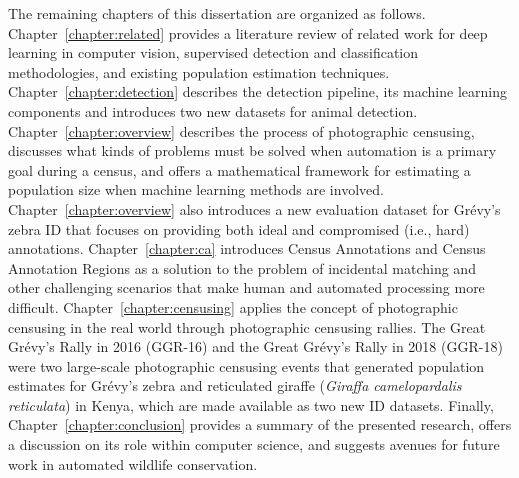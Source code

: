 The remaining chapters of this dissertation are organized as follows.  Chapter~\ref{chapter:related} provides a literature review of related work for deep learning in computer vision, supervised detection and classification methodologies, and existing population estimation techniques.  Chapter~\ref{chapter:detection} describes the detection pipeline, its machine learning components and introduces two new datasets for animal detection.  Chapter~\ref{chapter:overview} describes the process of photographic censusing, discusses what kinds of problems must be solved when automation is a primary goal during a census, and offers a mathematical framework for estimating a population size when machine learning methods are involved.  Chapter~\ref{chapter:overview} also introduces a new evaluation dataset for Gr\'evy's zebra ID that focuses on providing both ideal and compromised (i.e., hard) annotations.  Chapter~\ref{chapter:ca} introduces Census Annotations and Census Annotation Regions as a solution to the problem of incidental matching and other challenging scenarios that make human and automated processing more difficult.  Chapter~\ref{chapter:censusing} applies the concept of photographic censusing in the real world through photographic censusing rallies.  The Great Gr\'evy's Rally in 2016 (GGR-16) and the Great Gr\'evy's Rally in 2018 (GGR-18) were two large-scale photographic censusing events that generated population estimates for Gr\'evy's zebra and reticulated giraffe (\textit{Giraffa camelopardalis reticulata}) in Kenya, which are made available as two new ID datasets. Finally, Chapter~\ref{chapter:conclusion} provides a summary of the presented research, offers a discussion on its role within computer science, and suggests avenues for future work in automated wildlife conservation.
